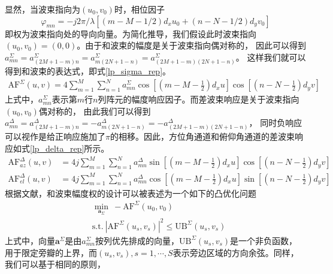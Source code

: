 \documentclass[master]{thesis-uestc}
\begin{document}
显然，当波束指向为$(u_0,v_0)$时，相位因子
$$
\varphi_{mn}=-j2\pi/\lambda\left[\left(m-M-1/2\right)d_xu_0+\left(n-N-1/2\right)d_yv_0\right]
$$
即权为波束指向处的导向向量。为简化推导，我们假设此时波束指向$(u_0,v_0)=(0,0)$。由于和波束的幅度是关于波束指向偶对称的，
因此可以得到$a^\Sigma_{mn}=a^\Sigma_{(2M+1-m)n}=a^\Sigma_{m(2N+1-n)}=a^\Sigma_{(2M+1-m)(2N+1-n)}$。
这样我们就可以得到和波束的表达式，即式\eqref{lp_sigma_rep}。
\begin{equation}\label{lp_sigma_rep}
    \begin{aligned}
        \text{AF}^\Sigma(u,v) = 
        4\sum_{m=1}^{M}\sum_{n=1}^{N}a^\Sigma_{mn}
        \cos\left[\left(m-M-\frac{1}{2}\right)d_xu\right]\cos\left[\left(n-N-\frac{1}{2}\right)d_yv\right]
    \end{aligned}
\end{equation}
上式中，$a^\Sigma_{mn}$表示第$m$行$n$列阵元的幅度响应因子。而差波束响应是关于波束指向$(u_0,v_0)$偶对称的，
由此我们可以得到$a^\Delta_{mn}=a^\Delta_{(2M+1-m)n}=-a^\Delta_{m(2N+1-n)}=-a^\Delta_{(2M+1-m)(2N+1-n)}$，
同时负响应可以视作是给正响应施加了$\pi$的相移。因此，方位角通道和俯仰角通道的差波束响应如式\eqref{lp_delta_rep}所示。
\begin{subequations}\label{lp_delta_rep}
    \begin{align}
        \text{AF}^\Delta_{az}(u,v)&=
        4j\sum_{m=1}^M\sum_{n=1}^Na^\Delta_{mn}
        \sin\left[\left(m-M-\frac{1}{2}\right)d_xu\right]\cos\left[\left(n-N-\frac{1}{2}\right)d_yv\right] \\
        \text{AF}^\Delta_{el}(u,v)&=
        4j\sum_{m=1}^M\sum_{n=1}^Na^\Delta_{mn}
        \cos\left[\left(m-M-\frac{1}{2}\right)d_xu\right]\sin\left[\left(n-N-\frac{1}{2}\right)d_yv\right]
    \end{align}
\end{subequations}
根据文献\cite{Rocca}，和波束幅度权的设计可以被表述为一个如下的凸优化问题
\begin{equation}\label{lp_sigma_opt}
    \begin{aligned}
        &\min_{\bm{a}_\Sigma} ~ -\text{AF}^\Sigma(u_0,v_0) \\
        &\text{s.t.} ~ \left|\text{AF}^\Sigma(u_s,v_s)\right|^2 \leqslant \text{UB}^\Sigma(u_s,v_s)
    \end{aligned}
\end{equation}
上式中，向量$\bm{a}^\Sigma$是由$a_{mn}^\Sigma$按列优先排成的向量，$\text{UB}^\Sigma(u_s,v_s)$是一个非负函数，
用于限定旁瓣的上界，而$(u_s,v_s),s=1,\cdots,S$表示旁边区域的方向余弦。同样，我们可以基于相同的原则，
\end{document}
